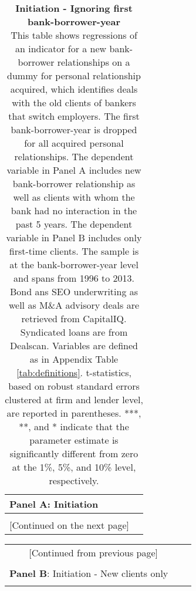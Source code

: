 \begin{table}[H] \begin{center} 
		\caption{\textbf{Initiation - Ignoring first bank-borrower-year} \\ This table shows regressions of an indicator for a new bank-borrower relationships on a dummy for personal relationship acquired, which identifies deals with the old clients of bankers that switch employers. The first bank-borrower-year is dropped for all acquired personal relationships. The dependent variable in Panel A includes new bank-borrower relationship as well as clients with whom the bank had no interaction in the past 5 years. The dependent variable in Panel B includes only first-time clients. The sample is at the bank-borrower-year level and spans from 1996 to 2013. Bond ans SEO underwriting as well as M\&A advisory deals are retrieved from CapitalIQ. Syndicated loans are from Dealscan. Variables are defined as in Appendix Table \ref{tab:definitions}. t-statistics, based on robust standard errors clustered at firm and lender level, are reported in parentheses. ***, **, and * indicate that the parameter estimate is significantly different from zero at the 1\%, 5\%, and 10\% level, respectively. } %
		\label{tab:init_nofirst} 
	\begin{threeparttable} 
		\begin{tabular*}{\hsize}{@{\hskip\tabcolsep\extracolsep\fill}l*{6}{c}} 	\multicolumn{5}{l}{\textbf{Panel A}: Initiation} \\
			\toprule  
				\def\sym#1{\ifmmode^{#1}\else\(^{#1}\)\fi}
				  
			\bottomrule \\  \multicolumn{6}{c}{[Continued on the next page]}  \end{tabular*}
			\end{threeparttable}   \end{center} \end{table}
\newpage
		\begin{table}[H] \begin{center} 
		\begin{threeparttable} 
		\begin{tabular*}{\hsize}{@{\hskip\tabcolsep\extracolsep\fill}l*{6}{c}}
			 \multicolumn{6}{c}{[Continued from previous page]} \\ \\
			 \multicolumn{5}{l}{\textbf{Panel B}: Initiation - New clients only} \\
			\toprule  
				\def\sym#1{\ifmmode^{#1}\else\(^{#1}\)\fi}
				 
			\bottomrule \end{tabular*}
	\end{threeparttable} \end{center}
\end{table}
\clearpage \newpage

